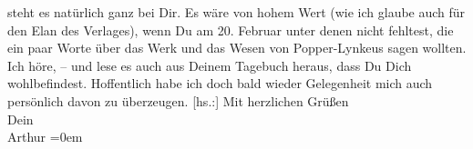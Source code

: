 \begin{ledgroupsized}[t]{13cm}
               steht es natürlich ganz bei Dir. Es wäre von hohem Wert (wie ich glaube auch für den
               Elan des Verlages), wenn Du am 20. Februar unter denen nicht fehltest,
               die ein paar Worte über das Werk und das Wesen von Popper-Lynkeus sagen wollten.\pend
           \pstart
           Ich höre\introOben{}, –\introOben{} und lese es auch aus Deinem Tagebuch heraus, dass Du Dich wohlbefindest. Hoffentlich habe ich
               doch bald wieder Gelegenheit mich auch persönlich davon zu überzeugen.\pend
           \pstart
           {[}hs.:{]} Mit herzlichen Grüßen{\\[\baselineskip]}Dein{\\[\baselineskip]}\spacefill\mbox{Arthur}\pend
           \leftskip=0em{}          \endnumbering{}\end{ledgroupsized}  \newcommand{\dateiname}{L02360}\newcommand{\titel}{Arthur Schnitzler an Hermann Bahr, 7. 2. 1921}\newcommand{\editorInnen}{ Kurt Ifkovits,  Martin Anton Müller}
            \footnotesize
\begin{ledgroupsized}[t]{11.5cm}
\end{ledgroupsized}
         
      